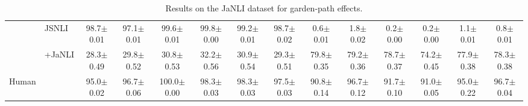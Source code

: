 \documentclass[11pt]{article}
\begin{document}
\begin{table*}[h!]
{\begin{tabular}{ll|cccccc|cccccc}
& JSNLI & 98.7{\small $\pm$0.01} & 97.1{\small $\pm$0.01} & 99.6{\small $\pm$0.01} & 99.8{\small $\pm$0.00}
& 99.2{\small $\pm$0.01} & 98.7{\small $\pm$0.02} & 0.6{\small $\pm$0.01} & 1.8{\small $\pm$0.02} & 0.2{\small $\pm$0.00} & 0.2{\small $\pm$0.00}
& 1.1{\small $\pm$0.01} & 0.8{\small $\pm$0.01} \\
& +JaNLI & 28.3{\small $\pm$0.49} & 29.8{\small $\pm$0.52} & 30.8{\small $\pm$0.53} & 32.2{\small $\pm$0.56}
& 30.9{\small $\pm$0.54} & 29.3{\small $\pm$0.51} & 79.8{\small $\pm$0.35} & 79.2{\small $\pm$0.36} & 78.7{\small $\pm$0.37} & 74.2{\small $\pm$0.45}
& 77.9{\small $\pm$0.38} & 78.3{\small $\pm$0.38} \\
\hline
Human &  & 95.0{\small $\pm$0.02} & 96.7{\small $\pm$0.06} & 100.0{\small $\pm$0.00} & 98.3{\small $\pm$0.03}
& 98.3{\small $\pm$0.03} & 97.5{\small $\pm$0.03} & 90.8{\small $\pm$0.14} & 96.7{\small $\pm$0.12} & 91.7{\small $\pm$0.10} & 91.0{\small $\pm$0.05}
& 95.0{\small $\pm$0.22} & 96.7{\small $\pm$0.04} \\ \hline
\end{tabular}
}
\caption{Results on the JaNLI dataset for garden-path effects.} 
\label{tab:results-garden}
\end{table*}
\end{document}
